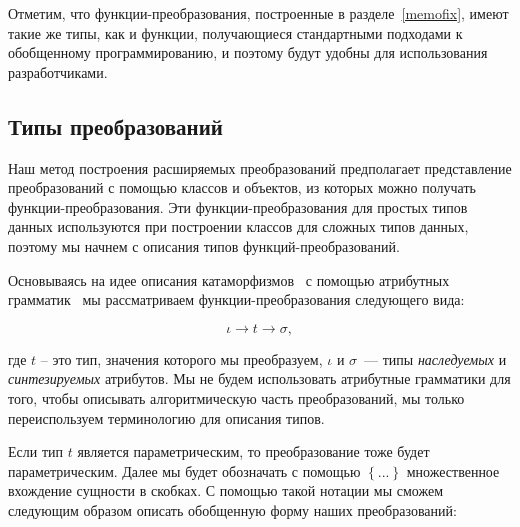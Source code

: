 \begin{comment}
Это ограничение вызывает трудности при построении функций-преобразований и преобразований для взаимно-рекурсивных типов, которые преодолеваются в разделах~\ref{memofix} и~\ref{murec}, соответственно. Построенные функции объединяются, что позволяет эмулировать (раздел~\ref{typeinfo}) возможность написание функций, индексированных типами (ad hoc полиморфизм~\cite{cardelli}).
\end{comment}

Отметим, что функции-преобразования, построенные в разделе~\ref{memofix}, имеют такие же типы, как и функции, получающиеся стандартными подходами к обобщенному программированию, и  поэтому будут удобны для использования разработчиками. 

\subsection{Типы преобразований}
\label{transtypes}


Наш метод построения расширяемых преобразований предполагает представление преобразований с помощью классов и объектов, из которых можно получать функции-преобразования. Эти функции-преобразования для простых типов данных используются при построении классов для сложных типов данных, поэтому мы начнем с описания типов функций-преобразований.

Основываясь на идее описания катаморфизмов~\cite{Bananas} с помощью атрибутных 
грамматик~\cite{AGKnuth,ObjectAlgebrasAttribute,AGSwierstra} мы рассматриваем функции-преобразования следующего вида:

\[
\iota \to t \to \sigma,
\]

\noindent где $t$ -- это тип, значения которого мы преобразуем, $\iota$ и $\sigma$~--- типы \emph{наследуемых} и \emph{синтезируемых} атрибутов. 
Мы не будем использовать атрибутные грамматики для того, чтобы описывать алгоритмическую часть преобразований, мы только переиспользуем терминологию для описания типов. 

Если тип $t$ является параметрическим, то преобразование тоже будет параметрическим. Далее мы будет обозначать с помощью
$\left\{...\right\}$ множественное вхождение сущности в скобках. С помощью такой нотации мы сможем следующим образом описать обобщенную форму наших преобразований:

